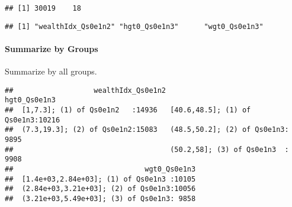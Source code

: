 \documentclass[
]{book}
\newenvironment{Shaded}{\begin{snugshade}}{\end{snugshade}}
\newcommand{\CommentTok}[1]{\textcolor[rgb]{0.56,0.35,0.01}{\textit{#1}}}
\newcommand{\ControlFlowTok}[1]{\textcolor[rgb]{0.13,0.29,0.53}{\textbf{#1}}}
\newcommand{\KeywordTok}[1]{\textcolor[rgb]{0.13,0.29,0.53}{\textbf{#1}}}
\newcommand{\NormalTok}[1]{#1}
\newcommand{\OperatorTok}[1]{\textcolor[rgb]{0.81,0.36,0.00}{\textbf{#1}}}
\newcommand{\StringTok}[1]{\textcolor[rgb]{0.31,0.60,0.02}{#1}}
\begin{document}
\begin{verbatim}
## [1] 30019    18
\end{verbatim}

\begin{Shaded}
\end{Shaded}

\begin{verbatim}
## [1] "wealthIdx_Qs0e1n2" "hgt0_Qs0e1n3"      "wgt0_Qs0e1n3"
\end{verbatim}

\hypertarget{summarize-by-groups}{%
\paragraph{Summarize by Groups}\label{summarize-by-groups}}

Summarize by all groups.

\begin{Shaded}
\end{Shaded}

\begin{verbatim}
##                   wealthIdx_Qs0e1n2                      hgt0_Qs0e1n3  
##  [1,7.3]; (1) of Qs0e1n2   :14936   [40.6,48.5]; (1) of Qs0e1n3:10216  
##  (7.3,19.3]; (2) of Qs0e1n2:15083   (48.5,50.2]; (2) of Qs0e1n3: 9895  
##                                     (50.2,58]; (3) of Qs0e1n3  : 9908  
##                               wgt0_Qs0e1n3  
##  [1.4e+03,2.84e+03]; (1) of Qs0e1n3 :10105  
##  (2.84e+03,3.21e+03]; (2) of Qs0e1n3:10056  
##  (3.21e+03,5.49e+03]; (3) of Qs0e1n3: 9858
\end{verbatim}

\begin{Shaded}
\end{Shaded}
\end{document}
